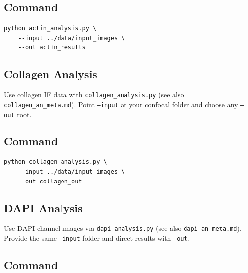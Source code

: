 \documentclass[11pt,a4paper]{article}
\begin{document}
\subsection*{Command}

\begin{center}
\begin{minipage}{0.9\linewidth}
\begin{verbatim}
python actin_analysis.py \
    --input ../data/input_images \
    --out actin_results
\end{verbatim}
\end{minipage}
\end{center}


\subsection{Collagen Analysis}

Use collagen IF data with \texttt{collagen\_analysis.py}  
(see also \texttt{collagen\_an\_meta.md}).  
Point \texttt{--input} at your confocal folder and choose any \texttt{--out} root.

\subsection*{Command}

\begin{center}
\begin{minipage}{0.9\linewidth}
\begin{verbatim}
python collagen_analysis.py \
    --input ../data/input_images \
    --out collagen_out
\end{verbatim}
\end{minipage}
\end{center}


\subsection{DAPI Analysis}

Use DAPI channel images via \texttt{dapi\_analysis.py}  
(see also \texttt{dapi\_an\_meta.md}).  
Provide the same \texttt{--input} folder and direct results with \texttt{--out}.

\subsection*{Command}
\end{document}
